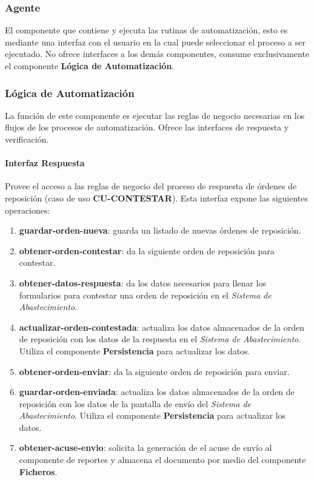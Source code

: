 \subsubsection{Agente}
El componente que contiene y ejecuta las rutinas de automatización, esto es mediante una interfaz con el usuario en la cual puede seleccionar el proceso a ser ejecutado. No ofrece interfaces a los demás componentes, consume exclusivamente el componente \textbf{Lógica de Automatización}.

\subsubsection{Lógica de Automatización}\label{sec:logica-auto}
La función de este componente es ejecutar las reglas de negocio necesarias en los flujos de los procesos de automatización. Ofrece las interfaces de respuesta y verificación.
\paragraph{\indent Interfaz Respuesta\\}
Provee el acceso a las reglas de negocio del proceso de respuesta de órdenes de reposición (caso de uso \textbf{CU-CONTESTAR}). Esta interfaz expone las siguientes operaciones:
\begin{enumerate}
	\item \textbf{guardar-orden-nueva}: guarda un listado de nuevas órdenes de reposición.
	\item \textbf{obtener-orden-contestar}: da la siguiente orden de reposición para contestar.
	\item \textbf{obtener-datos-respuesta}: da los datos necesarios para llenar los formularios para contestar una orden de reposición en el \textit{Sistema de Abastecimiento}.
	\item \textbf{actualizar-orden-contestada}: actualiza los datos almacenados de la orden de reposición con los datos de la respuesta en el \textit{Sistema de Abastecimiento}. Utiliza el componente \textbf{Persistencia} para actualizar los datos.
	\item \textbf{obtener-orden-enviar}: da la siguiente orden de reposición para enviar.
	\item \textbf{guardar-orden-enviada}: actualiza los datos almacenados de la orden de reposición con los datos de la pantalla de envío del \textit{Sistema de Abastecimiento}. Utiliza el componente \textbf{Persistencia} para actualizar los datos.
	\item \textbf{obtener-acuse-envio}: solicita la generación de el acuse de envío al componente de reportes y almacena el documento por medio del componente \textbf{Ficheros}.
\end{enumerate}

